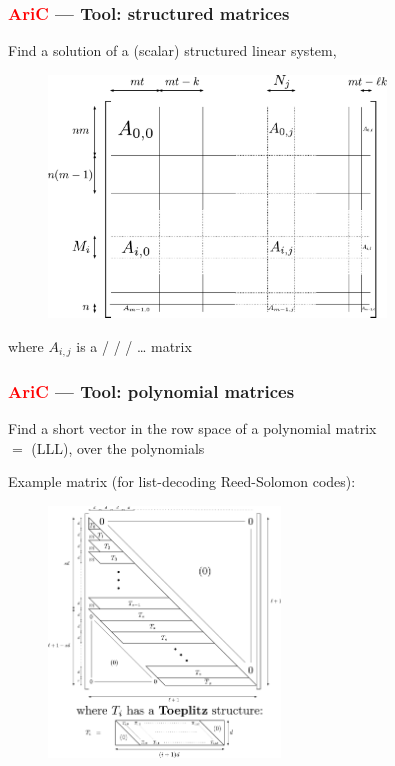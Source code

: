 \documentclass[c]{beamer}
\begin{document}
\begin{frame}
	\frametitle{\textcolor{red}{AriC} --- Tool: structured matrices}

	Find a \alert{solution} of a (scalar) \alert{structured linear system},
	\begin{figure}
		\centering
		\includegraphics[width=0.8\textwidth]{JDD2014/figures/block_hankel_system.pdf}
	\end{figure}
	where $A_{i,j}$ is a  /  
	/  / \ldots{} matrix
\end{frame}

\begin{frame}
	\frametitle{\textcolor{red}{AriC} --- Tool: polynomial matrices}

	Find a \alert{short vector} in the row space of a \alert{polynomial matrix}\\
	$=$  (LLL), over the polynomials

	\medskip
	Example matrix (for list-decoding Reed-Solomon codes):
	\begin{figure}
		\centering
		\includegraphics[width=0.55\textwidth]{JDD2014/figures/structured_lattice_matrix.pdf}
	\end{figure}
\end{frame}
\end{document}
